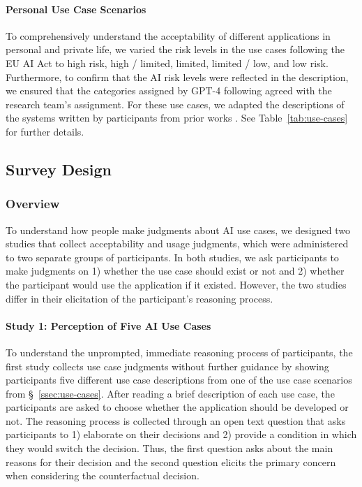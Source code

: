 \paragraph{Personal Use Case Scenarios} 
 To comprehensively understand the acceptability of different applications in personal and private life, we varied the risk levels in the use cases following the EU AI Act to high risk, high / limited, limited, limited / low, and low risk. Furthermore, to confirm that the AI risk levels were reflected in the description, we ensured that the categories assigned by GPT-4 following \citeauthor{herdel2024exploregen} agreed with the research team's assignment. For these use cases, we adapted the descriptions of the systems written by participants from prior works \citep{mun2024participaidemocraticsurveyingframework,kieslich2024myfuture}. See Table~\ref{tab:use-cases} for further details.


\subsection{Survey Design}
\label{ssec:survey-design}
\subsubsection{Overview}
To understand how people make judgments about AI use cases, we designed two studies that collect acceptability and usage judgments, which were administered to two separate groups of participants. In both studies, we ask participants to make judgments on 1) whether the use case should exist or not and 2) whether the participant would use the application if it existed. However, the two studies differ in their elicitation of the participant's reasoning process. 

\paragraph{Study 1: Perception of Five AI Use Cases}
To understand the unprompted, immediate reasoning process of participants, the first study collects use case judgments without further guidance by showing participants five different use case descriptions from one of the use case scenarios from \S~\ref{ssec:use-cases}. After reading a brief description of each use case, the participants are asked to choose whether the application should be developed or not. The reasoning process is collected through an open text question that asks participants to 1) elaborate on their decisions and 2) provide a condition in which they would switch the decision. Thus, the first question asks about the main reasons for their decision and the second question elicits the primary concern when considering the counterfactual decision. 


